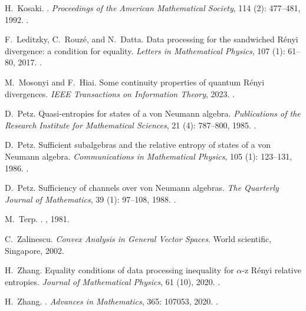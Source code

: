 \documentclass[12pt]{article}
\theoremstyle{definition}
\theoremstyle{remark}
\numberwithin{equation}{section}
\begin{document}
\begin{thebibliography}{27}
H.~Kosaki.
.
\newblock \emph{Proceedings of the American Mathematical Society}, 114
  (2): 477--481, 1992.
\newblock {}.

F.~Leditzky, C.~Rouz{\'e}, and N.~Datta.
\newblock Data processing for the sandwiched {R}{\'e}nyi divergence: a
  condition for equality.
\newblock \emph{Letters in Mathematical Physics}, 107 (1):
  61--80, 2017.
\newblock {}.

M.~Mosonyi and F.~Hiai.
\newblock Some continuity properties of quantum {R}ényi divergences.
\newblock \emph{IEEE Transactions on Information Theory}, 2023.
\newblock {}.

D.~Petz.
\newblock Quasi-entropies for states of a von {N}eumann algebra.
\newblock \emph{Publications of the Research Institute for Mathematical
  Sciences}, 21 (4): 787--800, 1985.
\newblock {}.

D.~Petz.
\newblock Sufficient subalgebras and the relative entropy of states of a von
  {Neumann} algebra.
\newblock \emph{Communications in Mathematical Physics}, 105
  (1): 123--131, 1986.
\newblock {}.

D.~Petz.
\newblock Sufficiency of channels over von {Neumann} algebras.
\newblock \emph{The Quarterly Journal of Mathematics}, 39
  (1): 97--108, 1988.
\newblock {}.

M.~Terp.
.
, {1981}.

C.~Zalinescu.
\newblock \emph{Convex Analysis in General Vector Spaces}.
\newblock World scientific, Singapore, 2002.

H.~Zhang.
\newblock Equality conditions of data processing inequality for $\alpha$-z
  {R}{\'e}nyi relative entropies.
\newblock \emph{Journal of Mathematical Physics}, 61 (10),
  2020{}.
\newblock {}.

H.~Zhang.
.
\newblock \emph{Advances in Mathematics}, 365: 107053,
  2020{}.
\newblock {}.

\end{thebibliography}



%
%
\end{document}
